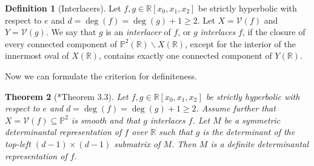\documentclass[a4paper,10pt]{amsart}
\theoremstyle{definition}
\newtheorem{Def}{Definition}[section]
\theoremstyle{plain}
\newtheorem{thm}[Def]{Theorem}
\newcommand{\cV}{{\mathcal V}}
\newcommand{\R}{{\mathbb R}}
\newcommand{\pp}{\mathbb{P}}
\begin{document}
\begin{Def}[Interlacers]
    Let $f,g\in\R[x_0,x_1,x_2]$ be strictly hyperbolic with respect to $e$ and $d=\deg(f)=\deg(g)+1\geq2$. Let $X=\cV(f)$ and $Y=\cV(g)$. We say that $g$ is an \emph{interlacer} of $f$, or $g$ \emph{interlaces} $f$, if the closure of every connected component of $\pp^2(\R)\smallsetminus X(\R)$, except for the interior of the innermost oval of $X(\R)$, contains exactly one connected component of $Y(\R)$.
\end{Def}

Now we can formulate the criterion for definiteness.
\begin{thm}[\cite{PlaumannVinzantHyp2013LDR}*{Theorem 3.3}]\label{thm:interlmakesdef}
    Let $f,g\in\R[x_0,x_1,x_2]$ be strictly hyperbolic with respect to $e$ and $d=\deg(f)=\deg(g)+1\geq2$. Assume further that $X=\cV(f)\subseteq\pp^2$ is smooth and that $g$ interlaces $f$. Let $M$ be a symmetric determinantal representation of $f$ over $\R$ such that $g$ is the determinant of the top-left $(d-1)\times(d-1)$ submatrix of $M$. Then $M$ is a definite determinantal representation of $f$.
\end{thm}
\end{document}
